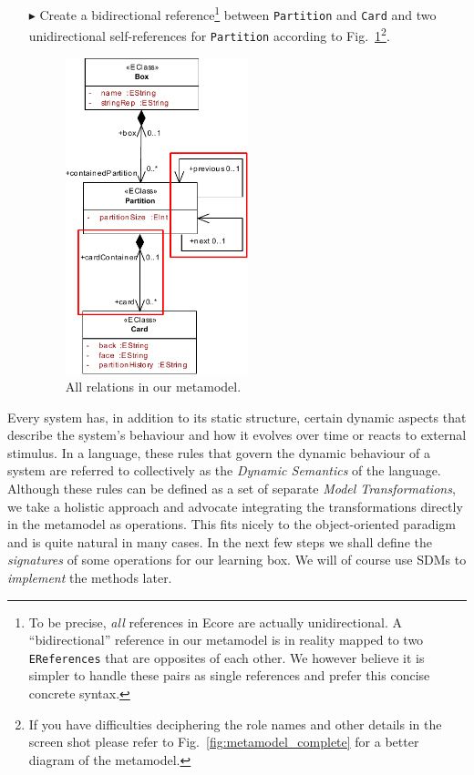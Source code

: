 \begin{enumerate}
\item[$\blacktriangleright$] Create a bidirectional reference\footnote{To be precise, \emph{all} references in Ecore are actually unidirectional.
A ``bidirectional'' reference in our metamodel is in reality mapped to two \texttt{EReferences} that are opposites of each other.
We however believe it is simpler to handle these pairs as single references and prefer this concise concrete syntax.} between \texttt{Partition} and \texttt{Card} and two unidirectional self-references for \texttt{Partition} according to Fig.~\ref{fig:ereferences_all}\footnote{If you have difficulties deciphering the role names and other details in the screen shot please refer to Fig.~\ref{fig:metamodel_complete} for a better diagram of the metamodel.}.

\begin{figure}[htbp]
	\centering
  \includegraphics[width=0.5\textwidth]{pics/memBoxBilder/memBox34.pdf}
	\caption{All relations in our metamodel.}
	\label{fig:ereferences_all}
\end{figure}
\end{enumerate}
\FloatBarrier

Every system has, in addition to its static structure, certain dynamic aspects that describe the system's behaviour and how it evolves over time or reacts to external stimulus.
In a language, these rules that govern the dynamic behaviour of a system are referred to collectively as the \emph{Dynamic Semantics} of the language.
Although these rules can be defined as a set of separate \emph{Model Transformations}, we take a holistic approach and advocate integrating the transformations directly in the metamodel as operations.
This fits nicely to the object-oriented paradigm and is quite natural in many cases.
In the next few steps we shall define the \emph{signatures} of some operations for our learning box.
We will of course use SDMs to \emph{implement} the methods later.

